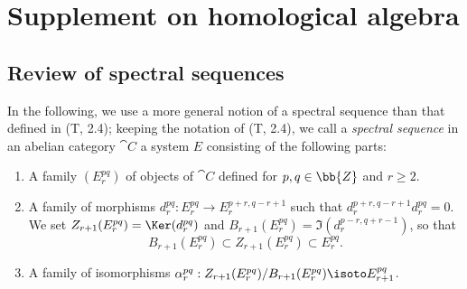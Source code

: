 \section{Supplement on homological algebra}
\label{section:0.11}

\subsection{Review of spectral sequences}
\label{subsection:0.11.1}

\begin{env}[11.1.1]
\label{0.11.1.1}
In the following, we use a more general notion of a spectral sequence than that defined in (T, 2.4); keeping the notation of (T, 2.4), we call a \emph{spectral sequence} in an abelian category $\cat{C}$ a system $E$ consisting of the following parts:
\begin{enumerate}
  \item[(a)] A family $(E_r^{pq})$ of objects of $\cat{C}$ defined for $p,q\in\bb{Z}$ and $r\geq 2$.
  \item[(b)] A family of morphisms $d_r^{pq}:E_r^{pq}\to E_r^{p+r,q-r+1}$ such that $d_r^{p+r,q-r+1}d_r^{pq}=0$.
    We set $Z_{r+1}(E_r^{pq})=\Ker(d_r^{pq})$ and $B_{r+1}(E_r^{pq})=\Im(d_r^{p-r,q+r-1})$, so that
    \[
      B_{r+1}(E_r^{pq})\subset Z_{r+1}(E_r^{pq})\subset E_r^{pq}.
    \]
  \item[(c)] A family of isomorphisms $\alpha_r^{pq}:Z_{r+1}(E_r^{pq})/B_{r+1}(E_r^{pq})\isoto E_{r+1}^{pq}$.


\end{enumerate}
\end{env}
